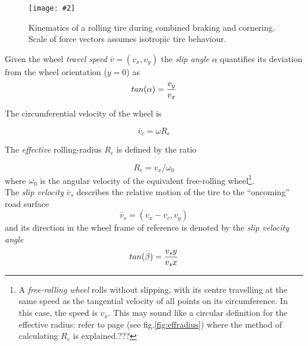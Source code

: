 \documentclass[12pt,a4paper]{report}
\newcommand{\virgolette}[1]{
\textquotedblleft #1\textquotedblright
}
\newcommand{\figura}[5][htbp]{
\begin{figure}[#1]
\begin{center}
\texttt{[image: \#2]}
\caption{#4}\label{#5}
\end{center}
\end{figure}
}
\begin{document}
\figura{pix/slipdefsven.jpg}{width=\textwidth}{Kinematics of a rolling tire during combined braking and cornering. Scale of force vectors assumes isotropic tire behaviour.}{fig:tirekinematics}

Given the wheel \emph{travel speed} $\bar{v}=(v_x , v_y)$ the \emph{slip angle} $\alpha$ quantifies its deviation from the wheel orientation ($y=0$) as
\begin{equation}\label{eqn:slipalfa}
tan(\alpha) = {v_y \over v_x}
\end{equation}

The circumferential velocity of the wheel is

\begin{equation}\label{eqn:VcOmegaRe}
\bar{v}_c=\omega R_e
\end{equation}

The \emph{effective} rolling-radius $R_e$ is defined by the ratio

\begin{equation}\label{eqn:ReVxSuOmega0}
R_e = {v_x}/{\omega_0}
\end{equation} where $\omega_0$ is the angular velocity of the equivalent free-rolling wheel\footnote{A \emph{free-rolling wheel} rolls without slipping, with its centre travelling at the same speed as the tangential velocity of all points on its circumference. In this case, the speed is $v_x$. This may sound like a circular definition for the effective radius: refer to page \pageref{sec:parameasures} (see fig.\ref{fig:effradius}) where the method of calculating $R_e$ is explained.???}.\\

The \emph{slip velocity} $\bar{v}_s$ describes the relative motion of the tire to the \virgolette{oncoming} road surface
\begin{equation}\label{eqn:slipvel}
\bar{v}_s = (v_x - v_c , v_y)
\end{equation}
and its direction in the wheel frame of reference is denoted by the \emph{slip velocity angle}
\begin{equation}\label{eqn:slipvelbeta}
tan(\beta) = {v_sy \over v_sx}
\end{equation}
\end{document}
